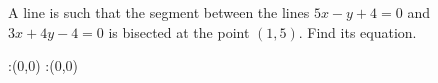 
%
%
%
%      
% 
% 
%   

  \renewcommand{\vbone}{5}
  \renewcommand{\vbtwo}{-}
  \renewcommand{\vbthree}{+4}
  \renewcommand{\vbfour}{3}
  \renewcommand{\vbfive}{+4}
  \renewcommand{\vbsix}{-4}

\question  A line is such that the segment between the lines 
$\vbone x\vbtwo y\vbthree=0$ and $\vbfour x\vbfive y\vbsix=0$ is 
bisected at the point $(1,5)$. Find its equation.

\insertQR{}

\ifprintanswers
  \begin{marginfigure}
      :(0,0)
      :(0,0)
    \figdrawbegin{}
      \figdrawline [100,101]
    \figdrawend
    \figvisu{\figBoxA}{}{%
    }
    \centerline{\box\figBoxA}
  \end{marginfigure}
\fi 

